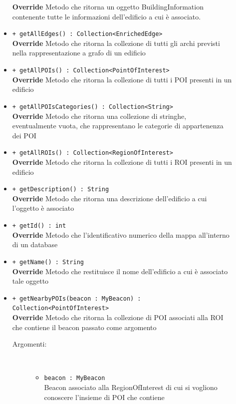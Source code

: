 \documentclass[../DefinizioneDiProdotto.tex]{subfiles}
\begin{document}
\begin{description}
\begin{itemize}
		\textbf{Override} Metodo che ritorna un oggetto BuildingInformation contenente tutte le informazioni dell'edificio a cui è associato.
		\item \texttt{+ getAllEdges() : Collection<EnrichedEdge>}\\
		\textbf{Override} Metodo che ritorna la collezione di tutti gli archi previsti nella rappresentazione a grafo di un edificio
		\item \texttt{+ getAllPOIs() : Collection<PointOfInterest>}\\
		\textbf{Override} Metodo che ritorna la collezione di tutti i POI presenti in un edificio
		\item \texttt{+ getAllPOIsCategories() : Collection<String>}\\
		\textbf{Override} Metodo che ritorna una collezione di stringhe, eventualmente vuota, che rappresentano le categorie di appartenenza dei POI
		\item \texttt{+ getAllROIs() : Collection<RegionOfInterest>}\\
		\textbf{Override} Metodo che ritorna la collezione di tutti i ROI presenti in un edificio
		\item \texttt{+ getDescription() : String}\\
		\textbf{Override} Metodo che ritorna una descrizione dell'edificio a cui l'oggetto è associato
		\item \texttt{+ getId() : int}\\
		\textbf{Override} Metodo che l'identificativo numerico della mappa all'interno di un database
		\item \texttt{+ getName() : String}\\
		\textbf{Override} Metodo che restituisce il nome dell'edificio a cui è associato tale oggetto
		\item \texttt{+ getNearbyPOIs(beacon : MyBeacon) : Collection<PointOfInterest>}\\
		\textbf{Override} Metodo che ritorna la collezione di POI associati alla ROI che contiene il beacon passato come argomento
		\begin{description}
			\item[Argomenti:] \
			\begin{itemize}
				\item \texttt{beacon : MyBeacon}\\
				Beacon associato alla RegionOfInterest di cui si vogliono conoscere l'insieme di POI che contiene\end{itemize}
		\end{description}

\end{itemize}
\end{description}
\end{document}

